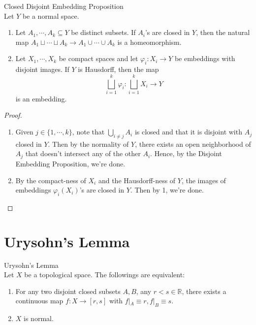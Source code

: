 \begin{proposition}{Closed Disjoint Embedding Proposition}\\
Let $Y$ be a normal space.
\begin{enumerate}
    \item Let $A_1,\cdots, A_k \subseteq Y$ be distinct subsets. If $A_i$'s are closed in $Y$, then the natural map $A_1 \sqcup \cdots \sqcup A_k \to A_1 \cup \cdots \cup A_k$ is a homeomorphism.

    \item Let $X_1,\cdots, X_k$ be compact spaces and let $\varphi_i: X_i \to Y$ be embeddings with disjoint images. If $Y$ is Hausdorff, then the map
    $$\bigsqcup_{i=1}^k \varphi_i : \bigsqcup_{i=1}^k X_i \to Y$$
    is an embedding.
\end{enumerate}
\end{proposition}

\begin{proof}
    \begin{enumerate}
        \item Given $j \in \{1,\cdots,k\}$, note that $\bigcup_{i \neq j} A_i$ is closed and that it is disjoint with $A_j$ closed in $Y$. Then by the normality of $Y$, there exists an open neighborhood of $A_j$ that doesn't intersect any of the other $A_i$. Hence, by the Disjoint Embedding Proposition, we're done.

        \item By the compact-ness of $X_i$ and the Hausdorff-ness of $Y$, the images of embeddings $\varphi_i(X_i)$'s are closed in $Y$. Then by 1, we're done.
    \end{enumerate}
\end{proof}

\section{Urysohn's Lemma}

\begin{lemma}{Urysohn's Lemma}\\
Let $X$ be a topological space. The followings are equivalent:
\begin{enumerate}
    \item For any two disjoint closed subsets $A,B$, any $r<s \in \mathbb{R}$, there exists a continuous map $f: X \to [r,s]$ with $f|_A \equiv r, f|_B \equiv s$.
    \item $X$ is normal.
\end{enumerate}
\end{lemma}

